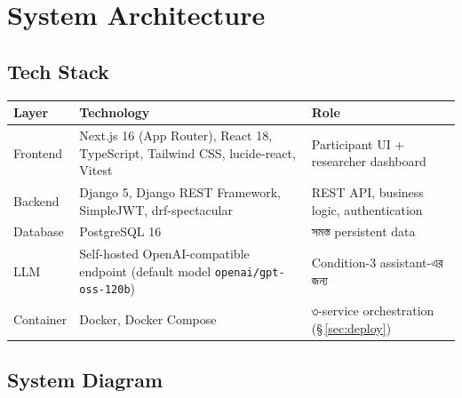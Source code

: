 \documentclass[11pt,a4paper]{article}
\newcommand{\code}[1]{\texttt{\small #1}}
\begin{document}
\newpage
\section{System Architecture}

\subsection{Tech Stack}

\begin{longtable}{@{}p{3.2cm}p{4.8cm}p{7.4cm}@{}}
\toprule
\textbf{Layer} & \textbf{Technology} & \textbf{Role} \\
\midrule
\endhead
Frontend & Next.js 16 (App Router), React 18, TypeScript, Tailwind CSS, lucide-react, Vitest
  & Participant UI \;+\; researcher dashboard \\
Backend & Django 5, Django REST Framework, SimpleJWT, drf-spectacular
  & REST API, business logic, authentication \\
Database & PostgreSQL 16 & সমস্ত persistent data \\
LLM & Self-hosted OpenAI-compatible endpoint (default model \code{openai/gpt-oss-120b})
  & Condition-3 assistant-এর জন্য \\
Container & Docker, Docker Compose & ৩-service orchestration (\S\,\ref{sec:deploy}) \\
\bottomrule
\end{longtable}

\subsection{System Diagram}
\end{document}
